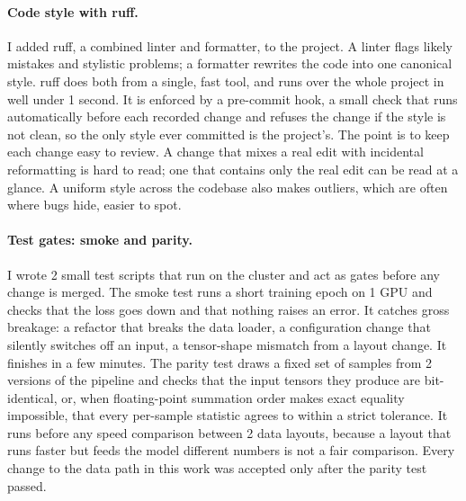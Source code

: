 \documentclass[12pt,a4paper]{article}
\begin{document}
\paragraph{Code style with ruff.} I added ruff, a combined linter and formatter, to the project. A
linter flags likely mistakes and stylistic problems; a formatter rewrites the code into one
canonical style. ruff does both from a single, fast tool, and runs over the whole project in well
under 1 second. It is enforced by a pre-commit hook, a small check that runs automatically before
each recorded change and refuses the change if the style is not clean, so the only style ever
committed is the project's. The point is to keep each change easy to review. A change that mixes a
real edit with incidental reformatting is hard to read; one that contains only the real edit can be
read at a glance. A uniform style across the codebase also makes outliers, which are often where
bugs hide, easier to spot.

\paragraph{Test gates: smoke and parity.} I wrote 2 small test scripts that run on the cluster and
act as gates before any change is merged. The smoke test runs a short training epoch on 1 GPU and
checks that the loss goes down and that nothing raises an error. It catches gross breakage: a
refactor that breaks the data loader, a configuration change that silently switches off an input, a
tensor-shape mismatch from a layout change. It finishes in a few minutes. The parity test draws a
fixed set of samples from 2 versions of the pipeline and checks that the input tensors they
produce are bit-identical, or, when floating-point summation order makes exact equality impossible,
that every per-sample statistic agrees to within a strict tolerance. It runs before any speed
comparison between 2 data layouts, because a layout that runs faster but feeds the model different
numbers is not a fair comparison. Every change to the data path in this work was accepted only after
the parity test passed.
\end{document}
